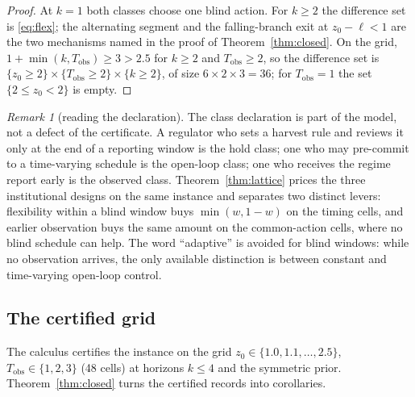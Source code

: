 \documentclass[11pt,a4paper]{article}
\theoremstyle{plain}
\theoremstyle{definition}
\theoremstyle{remark}
\newtheorem{remark}[theorem]{Remark}
\newcommand{\Tobs}{T_{\mathrm{obs}}}
\begin{document}
\begin{proof}
At $k=1$ both classes choose one blind action. For $k\ge2$ the difference set is \eqref{eq:flex}; the alternating segment and the falling-branch exit at $z_0-\ell<1$ are the two mechanisms named in the proof of Theorem~\ref{thm:closed}. On the grid, $1+\min(k,\Tobs)\ge3>2.5$ for $k\ge2$ and $\Tobs\ge2$, so the difference set is $\{z_0\ge2\}\times\{\Tobs\ge2\}\times\{k\ge2\}$, of size $6\times2\times3=36$; for $\Tobs=1$ the set $\{2\le z_0<2\}$ is empty.
\end{proof}

\begin{remark}[reading the declaration]\label{rem:declaration}
The class declaration is part of the model, not a defect of the certificate. A regulator who sets a harvest rule and reviews it only at the end of a reporting window is the hold class; one who may pre-commit to a time-varying schedule is the open-loop class; one who receives the regime report early is the observed class. Theorem~\ref{thm:lattice} prices the three institutional designs on the same instance and separates two distinct levers: flexibility within a blind window buys $\min(w,1-w)$ on the timing cells, and earlier observation buys the same amount on the common-action cells, where no blind schedule can help. The word ``adaptive'' is avoided for blind windows: while no observation arrives, the only available distinction is between constant and time-varying open-loop control.
\end{remark}

\subsection{The certified grid}

The calculus certifies the instance on the grid $z_0\in\{1.0,1.1,\dots,2.5\}$, $\Tobs\in\{1,2,3\}$ (48 cells) at horizons $k\le4$ and the symmetric prior. Theorem~\ref{thm:closed} turns the certified records into corollaries.
\end{document}
